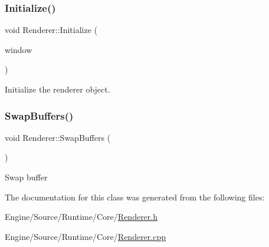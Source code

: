 \subsubsection{\texorpdfstring{Initialize()}{Initialize()}}
{\footnotesize\ttfamily void Renderer\+::\+Initialize (\begin{DoxyParamCaption}\item[{S\+D\+L\+\_\+\+Window $\ast$}]{window }\end{DoxyParamCaption})}

Initialize the renderer object. \mbox{\label{class_renderer_a09f2d3c7bac8ff314d860b9958a8531c}} 
\subsubsection{\texorpdfstring{Swap\+Buffers()}{SwapBuffers()}}
{\footnotesize\ttfamily void Renderer\+::\+Swap\+Buffers (\begin{DoxyParamCaption}{ }\end{DoxyParamCaption})}

Swap buffer 

The documentation for this class was generated from the following files\+:\begin{DoxyCompactItemize}
\item 
Engine/\+Source/\+Runtime/\+Core/\mbox{\hyperlink{_renderer_8h}{Renderer.\+h}}\item 
Engine/\+Source/\+Runtime/\+Core/\mbox{\hyperlink{_renderer_8cpp}{Renderer.\+cpp}}\end{DoxyCompactItemize}
